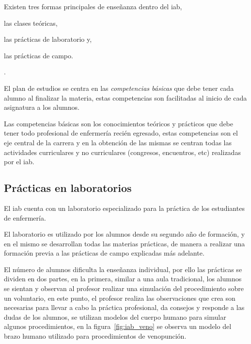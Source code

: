 Existen tres formas principales de enseñanza dentro del \Gls{iab}, 
\begin{enumerate*}[label=\itshape\alph*\upshape.]
\item las clases teóricas, 
\item las prácticas de laboratorio y, 
\item las prácticas de campo.
\end{enumerate*}.

El plan de estudios se centra en las \emph{competencias básicas} que debe tener
cada alumno al finalizar la materia, estas competencias son facilitadas al
inicio de cada asignatura a los alumnos.

Las competencias básicas son los conocimientos teóricos y prácticos que debe
tener todo profesional de enfermería recién egresado, estas competencias son el
eje central de la carrera y en la obtención de las mismas se centran todas las
actividades curriculares y no curriculares (congresos, encuentros, etc)
realizadas por el \Gls{iab}.



\subsection{Prácticas en laboratorios}
\label{sec:practica_lab}

El \Gls{iab} cuenta con un laboratorio especializado para la práctica de los
estudiantes de enfermería.

El laboratorio es utilizado por los alumnos desde su segundo año de formación, y
en el mismo se desarrollan todas las materias prácticas, de manera a realizar
una formación previa a las prácticas de campo explicadas más adelante.

El número de alumnos dificulta la enseñanza individual, por ello las prácticas se
dividen en dos partes, en la primera, similar a una aula tradicional, los
alumnos se sientan y observan al profesor realizar una simulación del
procedimiento sobre un voluntario, en este punto, el profesor realiza las
observaciones que crea son necesarias para llevar a cabo la práctica
profesional, da consejos y responde a las dudas de los alumnos,
se utilizan modelos del cuerpo humano para simular
algunos procedimientos, en la figura~\ref{fig:iab_veno} se observa un modelo del
brazo humano utilizado para procedimientos de venopunción.


